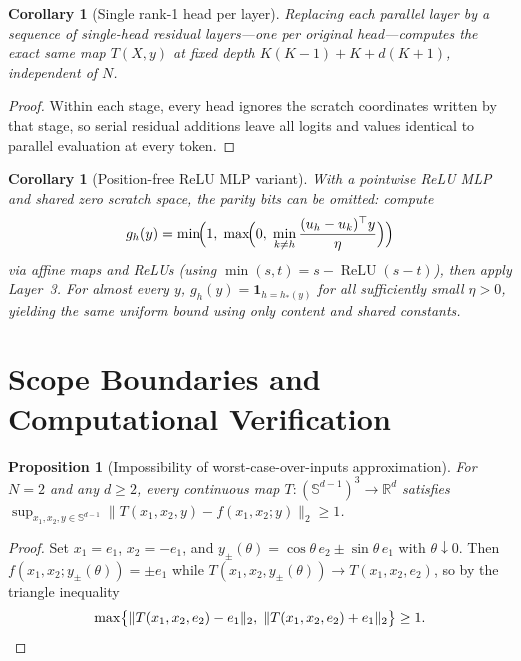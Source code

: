 \documentclass[11pt]{article}
\theoremstyle{plain}
\newtheorem{proposition}[theorem]{Proposition}
\newtheorem{corollary}[theorem]{Corollary}
\theoremstyle{definition}
\theoremstyle{remark}
\DeclareMathOperator{\ReLU}{ReLU}
\begin{document}
\begin{corollary}[Single rank-1 head per layer]\label{cor:serial}
Replacing each parallel layer by a sequence of single-head residual layers---one per original head---computes the exact same map $T(X, y)$ at fixed depth $K(K-1) + K + d(K+1)$, independent of $N$.
\end{corollary}

\begin{proof}
Within each stage, every head ignores the scratch coordinates written by that stage, so serial residual additions leave all logits and values identical to parallel evaluation at every token.
\end{proof}

\begin{corollary}[Position-free ReLU MLP variant]\label{cor:mlp}
With a pointwise ReLU MLP and shared zero scratch space, the parity bits can be omitted: compute
\[
g_h(y) = \min\!\Bigl(1,\; \max\!\Bigl(0,\; \min_{k \neq h} \frac{(u_h - u_k)^\top y}{\eta}\Bigr)\Bigr)
\]
via affine maps and ReLUs (using $\min(s, t) = s - \ReLU(s - t)$), then apply Layer~3.
For almost every $y$, $g_h(y) = \mathbf{1}_{h = h_*(y)}$ for all sufficiently small $\eta > 0$, yielding the same uniform bound using only content and shared constants.
\end{corollary}

\section{Scope Boundaries and Computational Verification}

\begin{proposition}[Impossibility of worst-case-over-inputs approximation]\label{prop:worst}
For $N = 2$ and any $d \ge 2$, every continuous map $T : (\mathbb{S}^{d-1})^3 \to \mathbb{R}^d$ satisfies $\sup_{x_1, x_2, y \in \mathbb{S}^{d-1}} \|T(x_1, x_2, y) - f(x_1, x_2; y)\|_2 \ge 1$.
\end{proposition}

\begin{proof}
Set $x_1 = e_1$, $x_2 = -e_1$, and $y_\pm(\theta) = \cos\theta\, e_2 \pm \sin\theta\, e_1$ with $\theta \downarrow 0$.
Then $f(x_1, x_2; y_\pm(\theta)) = \pm e_1$ while $T(x_1, x_2, y_\pm(\theta)) \to T(x_1, x_2, e_2)$, so by the triangle inequality
\[
\max\bigl\{\|T(x_1, x_2, e_2) - e_1\|_2,\; \|T(x_1, x_2, e_2) + e_1\|_2\bigr\} \ge 1. \qedhere
\]
\end{proof}
\end{document}
